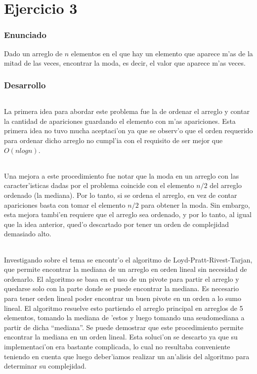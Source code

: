 \part{Ejercicio 3}
\section{Enunciado}
Dado un arreglo de $n$ elementos en el que hay un elemento que aparece m'as de la mitad de las 
veces, encontrar la moda, es decir, el valor que aparece m'as veces.

\section{Desarrollo}
\paragraph{}
La primera idea para abordar este problema fue la de ordenar el arreglo y contar la cantidad 
de apariciones guardando el elemento con m'as apariciones. Esta primera idea no tuvo mucha 
aceptaci'on ya que se observ'o que el orden requerido para ordenar dicho arreglo no cumpl'ia
con el requisito de ser mejor que $O(n log n)$.
\paragraph{}
Una mejora a este procedimiento fue notar que la moda en un arreglo con las caracter'isticas
dadas por el problema coincide con el elemento $n/2$ del arreglo ordenado (la mediana). Por lo tanto, 
si se ordena el arreglo, en vez de contar apariciones basta con tomar el elemento $n/2$ para 
obtener la moda. Sin embargo, esta mejora tambi'en requiere que el arreglo sea ordenado, y por
lo tanto, al igual que la idea anterior, qued'o descartado por tener un orden de complejidad
demasiado alto.
\paragraph{}
Investigando sobre el tema se encontr'o el algoritmo de Loyd-Pratt-Rivest-Tarjan, que permite 
encontrar la mediana de un arreglo en orden lineal sin necesidad de ordenarlo. El algoritmo 
se basa en el uso de un pivote para partir el arreglo y quedarse solo con la parte donde se 
puede encontrar la mediana. Es necesario para tener orden lineal poder encontrar un buen pivote 
en un orden a lo sumo lineal. El algoritmo resuelve esto partiendo el arreglo principal en arreglos
de 5 elementos, tomando la mediana de 'estos y luego tomando una seudomediana a partir de dicha ``mediana''. 
Se puede demostrar que este procedimiento permite encontrar la mediana en un orden lineal. Esta 
soluci'on se descarto ya que su implementaci'on era bastante complicada, lo cual no resultaba conveniente 
teniendo en cuenta que luego deber'iamos realizar un an'alisis del algoritmo para determinar su
complejidad.
